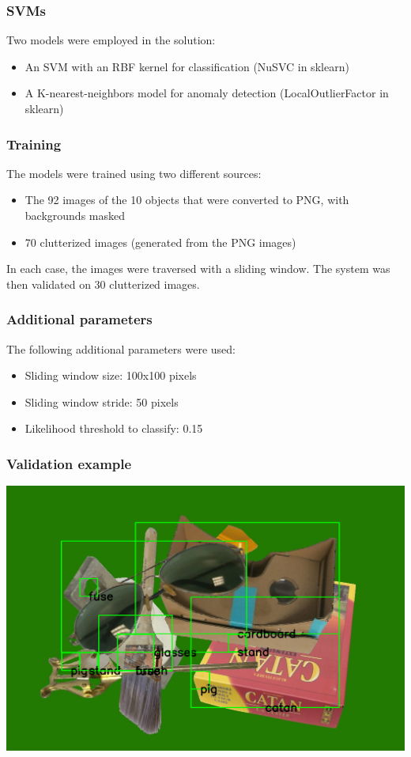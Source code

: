 \documentclass{beamer}
\begin{document}
\begin{frame}
  \frametitle{SVMs}
  Two models were employed in the solution:
  \begin{itemize}
    \item An SVM with an RBF kernel for classification (NuSVC in sklearn)
    \item A K-nearest-neighbors model for anomaly detection (LocalOutlierFactor in sklearn)
  \end{itemize}
\end{frame}

\begin{frame}
  \frametitle{Training}
  The models were trained using two different sources:
  \begin{itemize}
    \item The 92 images of the 10 objects that were converted to PNG, with backgrounds masked
    \item 70 clutterized images (generated from the PNG images)
  \end{itemize}
  In each case, the images were traversed with a sliding window. The system was then validated on 30 clutterized images.
\end{frame}

\begin{frame}
  \frametitle{Additional parameters}
  The following additional parameters were used:
  \begin{itemize}
    \item Sliding window size: 100x100 pixels
    \item Sliding window stride: 50 pixels
    \item Likelihood threshold to classify: 0.15
  \end{itemize}
\end{frame}

\begin{frame}
  \frametitle{Validation example}
  \includegraphics[width=\textwidth]{results.png}
\end{frame}
\end{document}
